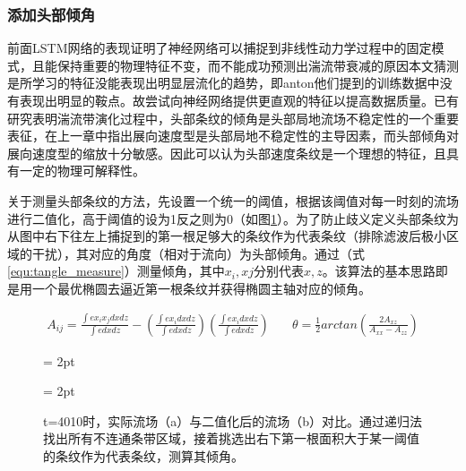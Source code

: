 \subsubsection{添加头部倾角}
前面LSTM网络的表现证明了神经网络可以捕捉到非线性动力学过程中的固定模式，且能保持重要的物理特征不变，而不能成功预测出湍流带衰减的原因本文猜测是所学习的特征没能表现出明显层流化的趋势，即anton他们提到的训练数据中没有表现出明显的鞍点。故尝试向神经网络提供更直观的特征以提高数据质量。已有研究表明湍流带演化过程中，头部条纹的倾角是头部局地流场不稳定性的一个重要表征，在上一章中指出展向速度型是头部局地不稳定性的主导因素，而头部倾角对展向速度型的缩放十分敏感。因此可以认为头部速度条纹是一个理想的特征，且具有一定的物理可解释性。

关于测量头部条纹的方法，先设置一个统一的阈值，根据该阈值对每一时刻的流场进行二值化，高于阈值的设为1反之则为0（如图\ref{fig:4010angle}）。为了防止歧义定义头部条纹为从图中右下往左上捕捉到的第一根足够大的条纹作为代表条纹（排除滤波后极小区域的干扰），其对应的角度（相对于流向）为头部倾角。通过（式\ref{equ:tangle_measure}）测量倾角\cite{Tao2017ExtendedLS}，其中$x_{i},x{j}$分别代表$x,z$。该算法的基本思路即是用一个最优椭圆去逼近第一根条纹并获得椭圆主轴对应的倾角。

\begin{equation}\label{equ:tangle_measure}
\begin{aligned}
A_{ij} = \frac{\int ex_{i}x_{j} dxdz}{\int e dxdz} - (\frac{\int e x_{i} dxdz}{\int e dxdz})(\frac{\int e x_{i} dxdz}{\int e dxdz})
\end{aligned}
\begin{aligned}
\quad
\theta = \frac{1}{2}arctan(\frac{2A_{xz}}{A_{xx}-A_{zz}})
\end{aligned}
\end{equation}


\begin{figure}[htb]
	\subfigbottomskip = 2pt
	\begin{minipage}[h]{0.5\linewidth}
	\centering
	\end{minipage}
	\quad
	\subfigbottomskip = 2pt
	\begin{minipage}[h]{0.5\linewidth}
	\centering
	\end{minipage}
	\quad
	\caption{t=4010时，实际流场（a）与二值化后的流场（b）对比。通过递归法找出所有不连通条带区域，接着挑选出右下第一根面积大于某一阈值的条纹作为代表条纹，测算其倾角。}
\label{fig:4010angle}
\end{figure}


